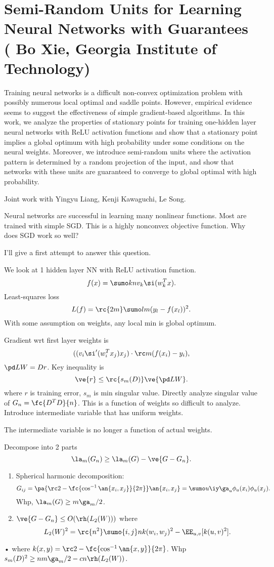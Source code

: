 \section{Semi-Random Units for Learning Neural Networks with Guarantees (
Bo Xie, Georgia Institute of Technology)}

Training neural networks is a difficult non-convex optimization problem with possibly numerous local optimal and saddle points. However, empirical evidence seems to suggest the effectiveness of simple gradient-based algorithms. In this work, we analyze the properties of stationary points for training one-hidden layer neural networks with ReLU activation functions and show that a stationary point implies a global optimum with high probability under some conditions on the neural weights. Moreover, we introduce semi-random units where the activation pattern is determined by a random projection of the input, and show that networks with these units are guaranteed to converge to global optimal with high probability.

Joint work with Yingyu Liang, Kenji Kawaguchi, Le Song.

Neural networks are successful in learning many nonlinear functions. Most are trained with simple SGD. This is a highly nonconvex objective function. Why does SGD work so well?

I'll give a first attempt to answer this question.

We look at 1 hidden layer NN with  ReLU activation function.
$$
f(x) = \sumo kn v_k\si(w_k^T x).
$$
Least-squares loss
$$
L(f) = \rc{2m} \sumo l m(y_l-f(x_l))^2.
$$
With some assumption on weights, any local min is global optimum.

Gradient wrt first layer weights is
$$
((v_i\si'(w_i^Tx_j)x_j)\cdot \rc m (f(x_i)-y_i),
$$
$\pd LW = Dr$. 
Key inequality is
$$
\ve{r} \le \rc{s_m(D)} \ve{\pd LW}.
$$
where $r$ is training error, $s_m$ is min singular value.
Directly analyze singular value of $G_n=\fc{D^TD}{n}$. This is a function of weights so difficult to analyze. Introduce intermediate variable that has uniform weights.

The intermediate variable is no longer a function of actual weights.

Decompose into 2 parts
$$
\la_m(G_n) \ge \la_m(G) - \ve{G-G_n}.
$$
\begin{enumerate}
\item
Spherical harmonic decomposition:
$$G_{ij} =\pa{\rc 2-\fc{\cos^{-1}\an{x_i,x_j}}{2\pi}} \an{x_i,x_j}=
 \sumo u\iy \ga_u \phi_u(x_i)\phi_u(x_j).$$
 Whp, $\la_m(G)\ge m\ga_m/2$.
\item
$\ve{G-G_n}\le O(\rh(L_2(W)))$ where 
$$
L_2(W)^2 = \rc{n^2} \sumo{i,j}n k(w_i,w_j)^2 -\EE_{u,v} [k(u,v)^2].
$$
\end{enumerate}•
where $k(x,y) = \rc 2 - \fc{\cos^{-1}\an{x,y}}{2\pi}$.
Whp $s_m(D)^2\ge nm\ga_m/2 - cn\rh(L_2(W))$. 

